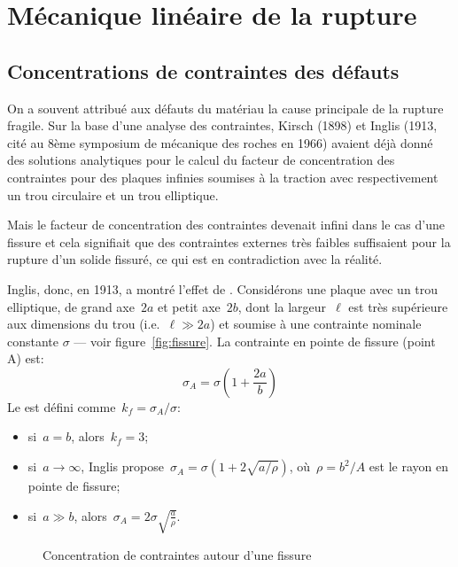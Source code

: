\medskip\ifVersionDuDocEstVincent\else\newpage\fi
\section{Mécanique linéaire de la rupture}

\medskip
\subsection{Concentrations de contraintes des défauts}

\begin{histoire}%
On a souvent attribué aux défauts du matériau la cause principale de la rupture fragile. Sur la base d'une analyse des contraintes, Kirsch (1898) et Inglis (1913, cité au 8ème symposium de mécanique des roches en 1966) avaient déjà donné des solutions analytiques pour le calcul du facteur de concentration des contraintes pour des plaques infinies soumises à la traction avec respectivement un trou circulaire et un trou elliptique.

\medskip
Mais le facteur de concentration des contraintes devenait infini dans le cas d'une fissure et cela signifiait que des contraintes externes très faibles suffisaient pour la rupture d'un solide fissuré, ce qui est en contradiction avec la réalité.
\end{histoire}

\medskip
Inglis, donc, en 1913, a montré l'effet de .
\medskipvm
Considérons une plaque avec un trou elliptique, de grand axe~$2a$ et petit axe~$2b$, dont la largeur~$\ell$ est très supérieure aux dimensions du trou (i.e.~$\ell\gg 2a$) et soumise à une contrainte nominale constante $\sigma$ --- voir figure~\ref{fig:fissure}. La contrainte en pointe de fissure (point A) est:
\begin{equation} \sigma_A = \sigma \left( 1+\frac{2a}b\right) \end{equation}
Le  est défini comme~$k_f = \sigma_A/\sigma$:
\begin{itemize}
  \item si~$a=b$, alors~$k_f=3$;
  \item si~$a\rightarrow\infty$, Inglis propose~$\sigma_A=\sigma (1+2\sqrt{a/\rho})$,
	où~$\rho=b^2/A$ est le rayon en pointe de fissure;
  \item si~$a\gg b$, alors~$\sigma_A=2\sigma \sqrt{\frac{a}{\rho}}$.
\end{itemize}
\begin{figure}[ht]\centering
{}\hspace{7em}
\caption{Concentration de contraintes autour d'une fissure}
\end{figure}

